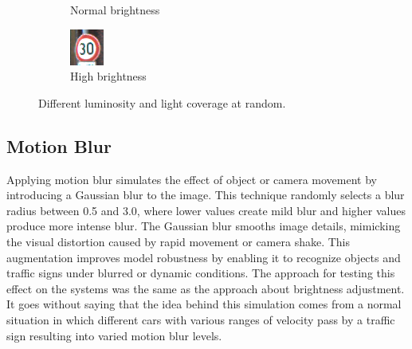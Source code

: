 \begin{figure}[H]
\begin{subfigure}{0.3\textwidth}
        \caption{Normal brightness}
        \label{fig:subfig2}
    \end{subfigure}
    \begin{subfigure}{0.25\textwidth}
        \includegraphics[width=\linewidth]{images/figure11/2.png}
        \caption{High brightness}
        \label{fig:subfig3}
    \end{subfigure}
    \caption{Different luminosity and light coverage at random.}
    \label{fig:fig11}
\end{figure}


\subsection{Motion Blur}

Applying motion blur simulates the effect of object or camera movement by introducing a Gaussian blur to the image. 
This technique randomly selects a blur radius between 0.5 and 3.0, where lower values create mild blur and higher values 
produce more intense blur. The Gaussian blur smooths image details, mimicking the visual distortion caused by rapid movement 
or camera shake. This augmentation improves model robustness by enabling it to recognize objects and traffic signs under 
blurred or dynamic conditions. The approach for testing this effect on the systems was the same as the approach about brightness 
adjustment. It goes without saying that the idea behind this simulation comes from a normal situation in which different cars
with various ranges of velocity pass by a traffic sign resulting into varied motion blur levels. 


